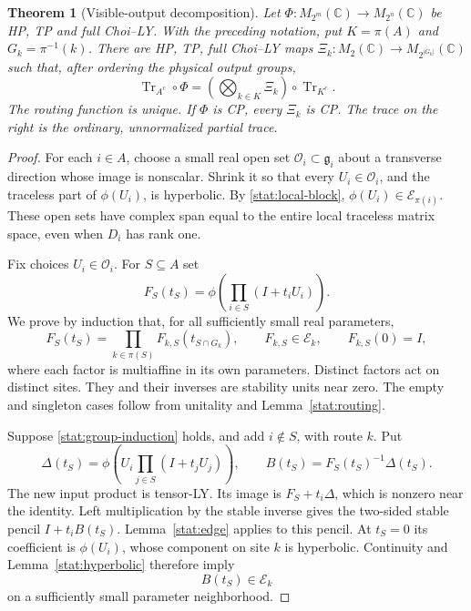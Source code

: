\documentclass[reqno]{amsart}
\newtheorem{theorem}{Theorem}[section]
\theoremstyle{definition}
\theoremstyle{remark}
\newcommand{\C}{\mathbb C}
\DeclareMathOperator{\Tr}{Tr}
\begin{document}
\begin{theorem}[Visible-output decomposition]
\label{stat:visible}
Let \(\Phi:M_{2^m}(\C)\to M_{2^n}(\C)\) be HP, TP and full
Choi--LY.  With the preceding notation, put \(K=\pi(A)\) and
\(G_k=\pi^{-1}(k)\).  There are HP, TP, full Choi--LY maps
\(\Xi_k:M_2(\C)\to M_{2^{|G_k|}}(\C)\) such that, after
ordering the physical output groups,
\begin{equation}
 \Tr_{A^c}\circ\Phi
 =\left(\bigotimes_{k\in K}\Xi_k\right)\circ\Tr_{K^c}.
 \label{stat:visible-form}
\end{equation}
The routing function is unique.  If \(\Phi\) is CP, every
\(\Xi_k\) is CP.  The trace on the right is the ordinary,
unnormalized partial trace.
\end{theorem}

\begin{proof}
For each \(i\in A\), choose a small real open set
\(\mathcal O_i\subset\mathfrak g_i\) about a transverse direction
whose image is nonscalar.  Shrink it so that every \(U_i\in
\mathcal O_i\), and the traceless part of \(\phi(U_i)\), is
hyperbolic.  By \eqref{stat:local-block},
\(\phi(U_i)\in\mathcal E_{\pi(i)}\).  These open sets have
complex span equal to the entire local traceless matrix space,
even when \(D_i\) has rank one.

Fix choices \(U_i\in\mathcal O_i\).  For \(S\subseteq A\) set
\[
 F_S(t_S)=\phi\left(\prod_{i\in S}(I+t_iU_i)\right).
\]
We prove by induction that, for all sufficiently small real parameters,
\begin{equation}
 F_S(t_S)=\prod_{k\in\pi(S)} F_{k,S}(t_{S\cap G_k}),
 \qquad F_{k,S}\in\mathcal E_k,\qquad F_{k,S}(0)=I,
 \label{stat:group-induction}
\end{equation}
where each factor is multiaffine in its own parameters.  Distinct
factors act on distinct sites.  They and their inverses are stability
units near zero.  The empty and singleton cases follow from unitality
and Lemma~\ref{stat:routing}.

Suppose \eqref{stat:group-induction} holds, and add \(i\notin S\),
with route \(k\).  Put
\[
 \Delta(t_S)=\phi\left(U_i\prod_{j\in S}(I+t_jU_j)\right),
 \qquad B(t_S)=F_S(t_S)^{-1}\Delta(t_S).
\]
The new input product is tensor-LY.  Its image is
\(F_S+t_i\Delta\), which is nonzero near the identity.  Left
multiplication by the stable inverse gives the two-sided stable
pencil \(I+t_iB(t_S)\).  Lemma~\ref{stat:edge} applies to this
pencil.  At \(t_S=0\) its coefficient is \(\phi(U_i)\), whose
component on site \(k\) is hyperbolic.  Continuity and
Lemma~\ref{stat:hyperbolic} therefore imply
\begin{equation}
 B(t_S)\in\mathcal E_k
 \label{stat:localized-increment}
\end{equation}
on a sufficiently small parameter neighborhood.


\end{proof}
\end{document}
